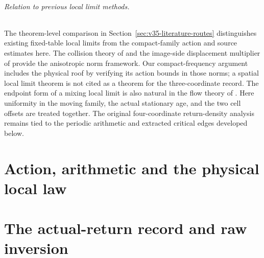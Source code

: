 \documentclass[11pt,reqno]{amsart}
\numberwithin{equation}{section}
\theoremstyle{definition}\newtheorem{definition}[theorem]{Definition}
\theoremstyle{remark}\newtheorem{remark}[theorem]{Remark}
\begin{document}
\paragraph{Relation to previous local limit methods.}
The theorem-level comparison in Section~\ref{sec:v35-literature-routes} distinguishes existing fixed-table local limits from the compact-family action and source estimates here. The collision theory of \cite{DZ11,DZ} and the image-side displacement
multiplier of \cite{DPZ} provide the anisotropic norm framework.
Our compact-frequency argument includes the physical roof by verifying
its action bounds in those norms; a spatial local limit theorem is not
cited as a theorem for the three-coordinate record. The endpoint form
of a mixing local limit is also natural in the flow theory of
\cite{DN}. Here uniformity in the moving family, the actual stationary
age, and the two cell offsets are treated together. The original
four-coordinate return-density analysis remains tied to the periodic
arithmetic and extracted critical edges developed below.

\part{Action, arithmetic and the physical local law}











\part{The actual-return record and raw inversion}

















\end{document}
